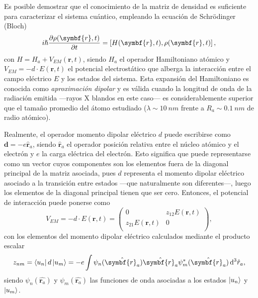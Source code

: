 Es posible demostrar \autocite{cohen-tannoudjiQuantumMechanicsVolume2019} que el conocimiento de la matriz de densidad es suficiente para caracterizar el sistema cuántico, empleando la ecuación de Schrödinger (Bloch)
\begin{equation}\label{eq:3.18}
  i \hslash \pdv{\rho(\symbf{r},t)}{t} = \left[H(\symbf{r},t),\rho(\symbf{r},t)\right],
\end{equation}
con $H = H_{a} + V_{EM}(\symbf{r},t)$, siendo $H_{a}$ el operador Hamiltoniano atómico y $V_{EM} = -d    \cdot E(\symbf{r},t)$ el potencial electrostático que alberga la interacción entre el campo eléctrico $E$ y los estados del sistema. Esta expansión del Hamiltoniano es conocida como \emph{aproximación dipolar} \autocite{jackson1998classical} y es válida cuando la longitud de onda de la radiación emitida ---rayos X blandos en este caso--- es considerablemente superior que el tamaño promedio del átomo estudiado ($\lambda \sim \qty{10}{nm}$ frente a $R_{a} \sim \qty{0.1}{nm}$ de radio atómico). 

Realmente, el operador momento dipolar eléctrico $d$ puede escribirse como $\symbf{d} = -e \hat{\symbf{r}}_{a}$, siendo $\hat{\symbf{r}}_{a}$ el operador posición relativa entre el núcleo atómico y el electrón y $e$ la carga eléctrica del electrón. Esto significa que puede representarse como un vector cuyos componentes son los elementos fuera de la diagonal principal de la matriz asociada, pues $d$ representa el momento dipolar eléctrico asociado a la transición entre estados ---que naturalmente son diferentes---, luego los elementos de la diagonal principal tienen que ser cero. Entonces, el potencial de interacción puede ponerse como
\begin{equation}\label{eq:3.19}
  V_{EM} = -d \cdot E(\symbf{r},t) =  
  \begin{pmatrix}
    0 & z_{12}E(\symbf{r},t) \\
    z_{21}E(\symbf{r},t) & 0 \\
  \end{pmatrix},
\end{equation}
con los elementos del momento dipolar eléctrico calculados mediante el producto escalar 
\begin{equation}\label{eq:3.20}
  z_{nm} = \bra{u_{n}}d \ket{u_{m}} = -e \int \psi_{n}(\hat{\symbf{r}_{a}}) \hat{\symbf{r}_{a}} \psi^{*}_{m}(\hat{\symbf{r}_{a}}) \diff^{3}\hat{r}_{a},
\end{equation}
siendo $\psi_{n}(\hat{\symbf{r}_{a}})$ y $\psi_{m}(\hat{\symbf{r}_{a}})$ las funciones de onda asociadas a los estados $\left|u_{n}\right\rangle$ y $\left|u_{m}\right\rangle$.

